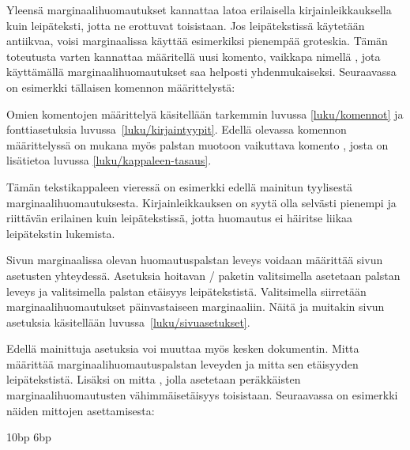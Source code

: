 \noindent
Yleensä marginaalihuomautukset kannattaa latoa erilaisella
kirjainleikkauksella kuin leipäteksti, jotta ne erottuvat toisistaan.
Jos leipätekstissä käytetään antiikvaa, voisi marginaalissa käyttää
esimerkiksi pienempää groteskia. Tämän toteutusta varten kannattaa
määritellä uusi komento, vaikkapa nimellä , jota
käyttämällä marginaalihuomautukset saa helposti yhdenmukaiseksi.
Seuraavassa on esimerkki tällaisen komennon määrittelystä:

\begin{koodilohkosis}
\newcommand{\huomautus}[1]{%
  \marginpar{\sffamily\scriptsize\RaggedRight #1}}
\end{koodilohkosis}

\noindent
Omien komentojen määrittelyä käsitellään tarkemmin luvussa
\ref{luku/komennot} ja fonttiasetuksia luvussa~\ref{luku/kirjaintyypit}.
Edellä olevassa komennon määrittelyssä on mukana myös palstan muotoon
vaikuttava komento , josta on lisätietoa luvussa
\ref{luku/kappaleen-tasaus}.

Tämän  tekstikappaleen vieressä
on esimerkki edellä mainitun tyylisestä marginaalihuomautuksesta.
Kirjainleikkauksen on syytä olla selvästi pienempi ja riittävän
erilainen kuin leipätekstissä, jotta huomautus ei häiritse liikaa
leipätekstin lukemista. \noclub[3]

Sivun marginaalissa olevan huomautuspalstan leveys voidaan määrittää
sivun asetusten yhteydessä. Asetuksia hoitavan \-/
paketin valitsimella  asetetaan palstan leveys ja
valitsimella  palstan etäisyys leipätekstistä.
Valitsimella  siirretään marginaalihuomautukset
päinvastaiseen marginaaliin. Näitä ja muitakin sivun asetuksia
käsitellään luvussa~\ref{luku/sivuasetukset}.

Edellä mainittuja asetuksia voi muuttaa myös kesken dokumentin. Mitta
 määrittää marginaalihuomautuspalstan leveyden ja
mitta  sen etäisyyden leipätekstistä. Lisäksi on
mitta , jolla asetetaan peräkkäisten
marginaalihuomautusten vähimmäisetäisyys toisistaan. Seuraavassa on
esimerkki näiden mittojen asettamisesta:

\begin{koodilohkosis}
\setlength{\marginparwidth}{50bp}
\setlength{\marginparsep}  {10bp}
\setlength{\marginparpush}  {6bp}
\end{koodilohkosis}


